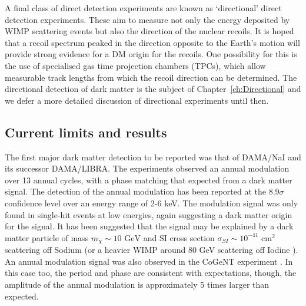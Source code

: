 A final class of direct detection experiments are known as `directional' direct detection experiments. These aim to measure not only the energy deposited by WIMP scattering events but also the direction of the nuclear recoils. It is hoped that a recoil spectrum peaked in the direction opposite to the Earth's motion will provide strong evidence for a DM origin for the recoils. One possibility for this is the use of specialised gas time projection chambers (TPCs), which allow measurable track lengths from which the recoil direction can be determined. The directional detection of dark matter is the subject of Chapter~\ref{ch:Directional} and we defer a more detailed discussion of directional experiments until then.

\subsection{Current limits and results}

The first major dark matter detection to be reported was that of DAMA/NaI \cite{Bernabei:2003} and its successor DAMA/LIBRA. The experiments observed an annual modulation over 13 annual cycles, with a phase matching that expected from a dark matter signal. The detection of the annual modulation has been reported at the $8.9\sigma$ confidence level over an energy range of 2-6 keV. The modulation signal was only found in single-hit events at low energies, again suggesting a dark matter origin for the signal. It has been suggested that the signal may be explained by a dark matter particle of mass $m_\chi \sim 10 \textrm{ GeV}$ and SI cross section $\sigma_{SI} \sim 10^{-41} \textrm{ cm}^2$ \cite{Belli:2011} scattering off Sodium (or a heavier WIMP around 80 GeV scattering off Iodine \cite{Savage:2009}). An annual modulation signal was also observed in the CoGeNT experiment \cite{Aalseth:2011b, Aalseth:2014a}. In this case too, the period and phase are consistent with expectations, though, the amplitude of the annual modulation is approximately 5 times larger than expected.

